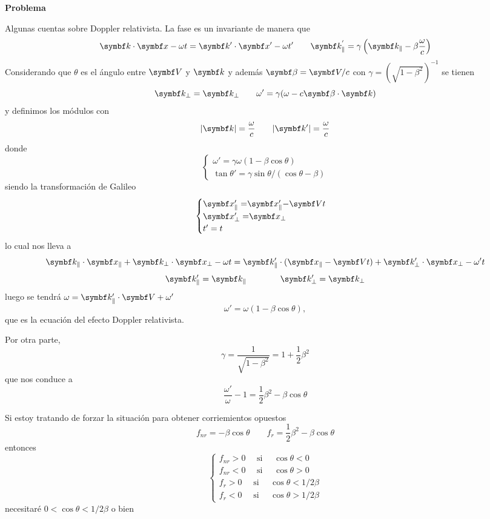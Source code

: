 \documentclass[10pt,oneside]{CBFT_book}
\begin{document}
\begin{ejemplo}{\bf Problema }

Algunas cuentas sobre Doppler relativista. La fase es un invariante de manera que
\[
	\pe{k}{x} - \omega t = \pe{k'}{x'} - \omega t' \qquad 
	\vb{k}_\parallel^{'} = \gamma \left( \vb{k}_\parallel - \beta \frac{\omega}{c} \right)
\]
Considerando que $\theta$ es el ángulo entre $\vb{V}$ y $\vb{k}$ y además
$\vb{\beta} = \vb{V}/c$ con $\gamma = (\sqrt{1-\beta^2})^{-1}$ se tienen
\[
	\vb{k}_\perp = \vb{k}_\perp \qquad \omega'= \gamma( \omega - c \pe{\beta}{k} )
\]
y definimos los módulos con
\[
	|\vb{k}| = \frac{\omega}{c} \qquad |\vb{k}'| = \frac{\omega}{c}
\]
donde
\[
	\begin{cases}
	 \omega' = \gamma \omega ( 1 - \beta\cos\theta ) \\
	 \tan\theta' = \gamma \sin\theta /( \cos\theta - \beta)
	\end{cases}
\]
siendo la transformación de Galileo
\[
	\begin{cases}
	 $\vb{x}$_{\parallel}' = $\vb{x}$_{\parallel}' - $\vb{V}$ t \\
	 $\vb{x}$_{\perp}' = $\vb{x}$_{\perp} \\
	 t'= t
	\end{cases}
\]
lo cual nos lleva a
\[
	\vb{k}_{\parallel} \cdot \vbx_{\parallel} + \vb{k}_{\perp} \cdot \vbx_{\perp} - \omega t =
	\vb{k}_{\parallel}' \cdot (\vbx_{\parallel} - \vb{V}t ) + \vb{k}_{\perp}'  \cdot \vbx_{\perp} - \omega' t
\]
\[
	\vb{k}_{\parallel}' = \vb{k}_{\parallel} \qquad \qquad 
	\vb{k}_{\perp}' = \vb{k}_{\perp}
\]
luego se tendrá $\omega =  \vb{k}_{\parallel}' \cdot \vb{V} + \omega'$
\[
	\omega' = \omega ( 1 - \beta \cos\theta ),
\]
que es la ecuación del efecto Doppler relativista.

Por otra parte,
\[
	\gamma = \frac{1}{\sqrt{1 - \beta^2}} = 1 + \frac{1}{2}\beta^2
\]
que nos conduce a
\[
	\frac{\omega'}{\omega} - 1 =   \frac{1}{2}\beta^2 - \beta \cos\theta 
\]

Si estoy tratando de forzar la situación para obtener corriemientos opuestos
\[
	f_{nr} = - \beta\cos\theta \qquad
	f_r = \frac{1}{2} \beta^2 - \beta\cos\theta
\]
entonces
\[
	\begin{cases}
	 f_{nr} > 0 \quad \text{ si } \quad \cos\theta < 0 \\
	 f_{nr} < 0 \quad \text{ si } \quad \cos\theta > 0 \\
	 f_{r} > 0 \quad \text{ si } \quad \cos\theta < 1/2 \beta  \\
	 f_{r} < 0 \quad \text{ si } \quad \cos\theta > 1/2 \beta
	\end{cases}
\]
necesitaré $ 0 < \cos\theta < 1/2 \beta$ o bien


\end{ejemplo}
\end{document}
